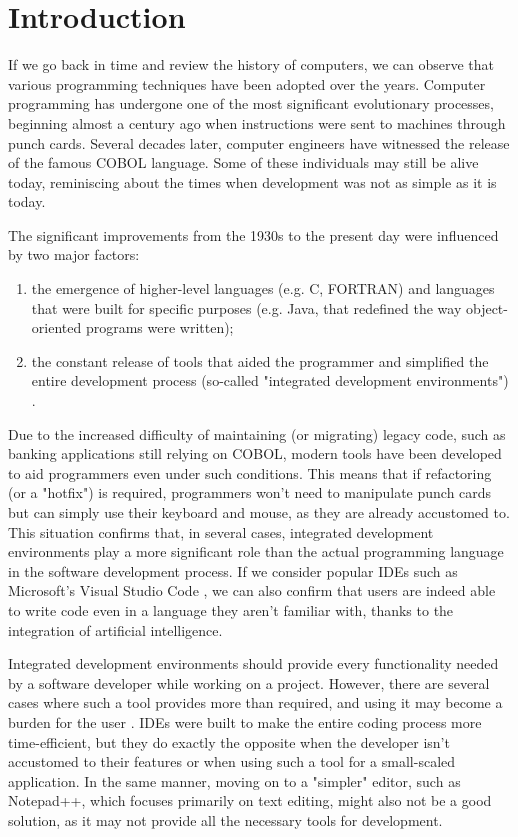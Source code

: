 \chapter{Introduction}
\thispagestyle{pagestyle}

If we go back in time and review the history of computers, we can observe that various programming techniques have been adopted over the years. Computer programming has undergone one of the most significant evolutionary processes, beginning almost a century ago when instructions were sent to machines through punch cards. Several decades later, computer engineers have witnessed the release of the famous COBOL language. Some of these individuals may still be alive today, reminiscing about the times when development was not as simple as it is today.

The significant improvements from the 1930s to the present day were influenced by two major factors:

\begin{enumerate}
  \item the emergence of higher-level languages (e.g. C, FORTRAN) and languages that were built for specific purposes (e.g. Java, that redefined the way object-oriented programs were written);
  \item the constant release of tools that aided the programmer and simplified the entire development process (so-called "integrated development environments") \cite{ide_bigbang}.
\end{enumerate}

Due to the increased difficulty of maintaining (or migrating) legacy code, such as banking applications still relying on COBOL, modern tools have been developed to aid programmers even under such conditions. This means that if refactoring (or a "hotfix") is required, programmers won't need to manipulate punch cards but can simply use their keyboard and mouse, as they are already accustomed to. This situation confirms that, in several cases, integrated development environments play a more significant role than the actual programming language in the software development process. If we consider popular IDEs such as Microsoft's Visual Studio Code \cite{vscode}, we can also confirm that users are indeed able to write code even in a language they aren't familiar with, thanks to the integration of artificial intelligence.

Integrated development environments should provide every functionality needed by a software developer while working on a project. However, there are several cases where such a tool provides more than required, and using it may become a burden for the user \cite{ide_productivity}. IDEs were built to make the entire coding process more time-efficient, but they do exactly the opposite when the developer isn't accustomed to their features or when using such a tool for a small-scaled application. In the same manner, moving on to a "simpler" editor, such as Notepad++, which focuses primarily on text editing, might also not be a good solution, as it may not provide all the necessary tools for development.

